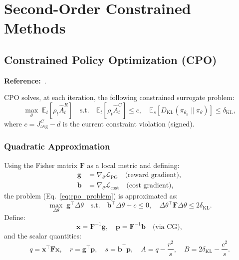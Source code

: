 \documentclass[12pt,a4paper]{article}
\theoremstyle{definition}
\newcommand{\E}{\mathbb{E}}
\newcommand{\piold}{\pi_{\theta_k}}
\newcommand{\KL}{D_{\mathrm{KL}}}
\newcommand{\Fmat}{\mathbf{F}}
\newcommand{\bvec}{\mathbf{b}}
\newcommand{\gvec}{\mathbf{g}}
\newcommand{\xvec}{\mathbf{x}}
\newcommand{\pvec}{\mathbf{p}}
\begin{document}
\section{Second-Order Constrained Methods}
\label{sec:secondorder}

\subsection{Constrained Policy Optimization (CPO)}
\label{sec:cpo}

\textbf{Reference:}~\citet{achiam2017constrained}.

CPO solves, at each iteration, the following constrained surrogate problem:
\begin{equation}
  \label{eq:cpo_problem}
  \max_\theta \;\E_t\!\left[\rho_t\hat{A}_t^R\right]
  \quad\text{s.t.}\quad
  \E_t\!\left[\rho_t\hat{A}_t^C\right] \leq c,
  \quad
  \E_s\!\left[\KL(\piold\|\pi_\theta)\right] \leq \delta_{\mathrm{KL}},
\end{equation}
where $c = J^C_{\mathrm{avg}} - d$ is the current constraint violation (signed).

\subsubsection{Quadratic Approximation}

Using the Fisher matrix $\Fmat$ as a local metric and defining:
\begin{align}
  \gvec &= \nabla_\theta \mathcal{L}_{\mathrm{PG}} \quad \text{(reward gradient)}, \\
  \bvec &= \nabla_\theta \mathcal{L}_{\mathrm{cost}} \quad \text{(cost gradient)},
\end{align}
the problem (Eq.~\ref{eq:cpo_problem}) is approximated as:
\begin{equation}
  \label{eq:cpo_qp}
  \max_{\Delta\theta}\;\gvec^\top\Delta\theta
  \quad\text{s.t.}\quad
  \bvec^\top\Delta\theta + c \leq 0,
  \quad
  \Delta\theta^\top\Fmat\Delta\theta \leq 2\delta_{\mathrm{KL}}.
\end{equation}
Define:
\begin{equation}
  \xvec = \Fmat^{-1}\gvec,\quad \pvec = \Fmat^{-1}\bvec \quad \text{(via CG)},
\end{equation}
and the scalar quantities:
\begin{equation}
  q = \xvec^\top\Fmat\xvec,\quad
  r = \gvec^\top\pvec,\quad
  s = \bvec^\top\pvec,\quad
  A = q - \frac{r^2}{s},\quad
  B = 2\delta_{\mathrm{KL}} - \frac{c^2}{s}.
\end{equation}
\end{document}
